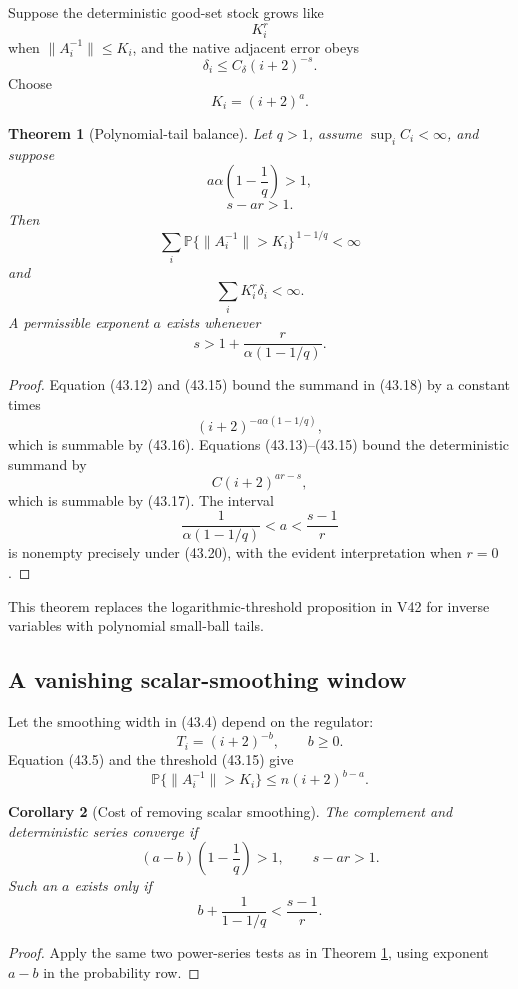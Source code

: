 \documentclass[11pt]{article}
\newtheorem{theorem}{Theorem}[section]
\newtheorem{corollary}[theorem]{Corollary}
\begin{document}
Suppose the deterministic good-set stock grows like
\[
 K_i^r
 \tag{43.13}
\]
when \(\|A_i^{-1}\|\leq K_i\), and the native adjacent error obeys
\[
 \delta_i\leq C_\delta(i+2)^{-s}.
 \tag{43.14}
\]
Choose
\[
 K_i=(i+2)^a.
 \tag{43.15}
\]

\begin{theorem}[Polynomial-tail balance]
\label{thm:v11v43-polynomial-balance}
Let \(q>1\), assume \(\sup_iC_i<\infty\), and suppose
\[
 a\alpha\left(1-\frac1q\right)>1,
 \tag{43.16}
\]
\[
 s-ar>1.
 \tag{43.17}
\]
Then
\[
 \sum_i
 \mathbb P\{\|A_i^{-1}\|>K_i\}^{\,1-1/q}<\infty
 \tag{43.18}
\]
and
\[
 \sum_iK_i^r\delta_i<\infty.
 \tag{43.19}
\]
A permissible exponent \(a\) exists whenever
\[
 s>
 1+\frac{r}{\alpha(1-1/q)}.
 \tag{43.20}
\]
\end{theorem}

\begin{proof}
Equation (43.12) and (43.15) bound the summand in (43.18) by a constant
times
\[
 (i+2)^{-a\alpha(1-1/q)},
\]
which is summable by (43.16).  Equations (43.13)--(43.15) bound the
deterministic summand by
\[
 C(i+2)^{ar-s},
\]
which is summable by (43.17).  The interval
\[
 \frac1{\alpha(1-1/q)}
 <a<
 \frac{s-1}{r}
\]
is nonempty precisely under (43.20), with the evident interpretation
when \(r=0\).
\end{proof}

This theorem replaces the logarithmic-threshold proposition in V42 for
inverse variables with polynomial small-ball tails.

\subsection{A vanishing scalar-smoothing window}

Let the smoothing width in (43.4) depend on the regulator:
\[
 T_i=(i+2)^{-b},\qquad b\geq0.
 \tag{43.21}
\]
Equation (43.5) and the threshold (43.15) give
\[
 \mathbb P\{\|A_i^{-1}\|>K_i\}
 \leq n(i+2)^{b-a}.
 \tag{43.22}
\]

\begin{corollary}[Cost of removing scalar smoothing]
\label{cor:v11v43-window}
The complement and deterministic series converge if
\[
 (a-b)\left(1-\frac1q\right)>1,
 \qquad
 s-ar>1.
 \tag{43.23}
\]
Such an \(a\) exists only if
\[
 b+\frac1{1-1/q}
 <
 \frac{s-1}{r}.
 \tag{43.24}
\]
\end{corollary}

\begin{proof}
Apply the same two power-series tests as in Theorem
\ref{thm:v11v43-polynomial-balance}, using exponent \(a-b\) in the
probability row.
\end{proof}
\end{document}

